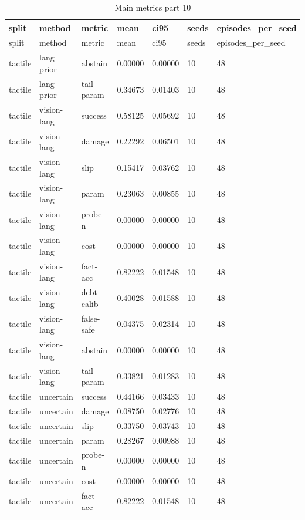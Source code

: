 \documentclass{article}
\begin{document}
\begin{center}
\tiny
\renewcommand{\arraystretch}{0.92}
\setlength{\tabcolsep}{3pt}
\begin{longtable}{lllllll}
\caption{Main metrics part 10}\label{tab:main-metrics-10}\\
\toprule
split & method & metric & mean & ci95 & seeds & episodes\_per\_seed \\
\midrule
\endfirsthead
\toprule
split & method & metric & mean & ci95 & seeds & episodes\_per\_seed \\
\midrule
\endhead
tactile & lang prior & abstain & 0.00000 & 0.00000 & 10 & 48 \\
tactile & lang prior & tail-param & 0.34673 & 0.01403 & 10 & 48 \\
tactile & vision-lang & success & 0.58125 & 0.05692 & 10 & 48 \\
tactile & vision-lang & damage & 0.22292 & 0.06501 & 10 & 48 \\
tactile & vision-lang & slip & 0.15417 & 0.03762 & 10 & 48 \\
tactile & vision-lang & param & 0.23063 & 0.00855 & 10 & 48 \\
tactile & vision-lang & probe-n & 0.00000 & 0.00000 & 10 & 48 \\
tactile & vision-lang & cost & 0.00000 & 0.00000 & 10 & 48 \\
tactile & vision-lang & fact-acc & 0.82222 & 0.01548 & 10 & 48 \\
tactile & vision-lang & debt-calib & 0.40028 & 0.01588 & 10 & 48 \\
tactile & vision-lang & false-safe & 0.04375 & 0.02314 & 10 & 48 \\
tactile & vision-lang & abstain & 0.00000 & 0.00000 & 10 & 48 \\
tactile & vision-lang & tail-param & 0.33821 & 0.01283 & 10 & 48 \\
tactile & uncertain & success & 0.44166 & 0.03433 & 10 & 48 \\
tactile & uncertain & damage & 0.08750 & 0.02776 & 10 & 48 \\
tactile & uncertain & slip & 0.33750 & 0.03743 & 10 & 48 \\
tactile & uncertain & param & 0.28267 & 0.00988 & 10 & 48 \\
tactile & uncertain & probe-n & 0.00000 & 0.00000 & 10 & 48 \\
tactile & uncertain & cost & 0.00000 & 0.00000 & 10 & 48 \\
tactile & uncertain & fact-acc & 0.82222 & 0.01548 & 10 & 48 \\

\end{longtable}
\end{center}
\end{document}
